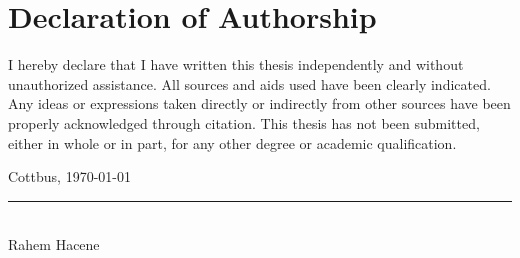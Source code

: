 \chapter*{Declaration of Authorship}

I hereby declare that I have written this thesis independently and without
unauthorized assistance. All sources and aids used have been clearly
indicated. Any ideas or expressions taken directly or indirectly from other
sources have been properly acknowledged through citation.  
This thesis has not been submitted, either in whole or in part, for any other
degree or academic qualification.

\vspace{2cm}

\noindent
Cottbus, \today

\vspace{1.5cm}

\noindent
\rule{7cm}{0.4pt}\\
Rahem Hacene